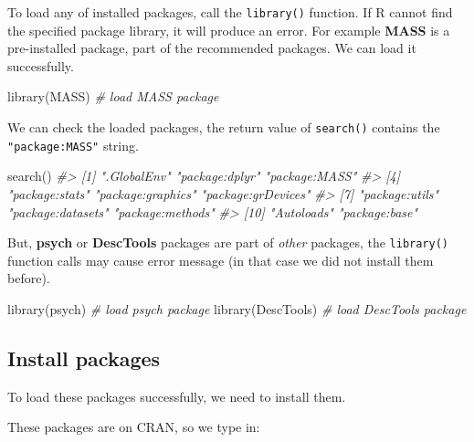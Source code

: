 \documentclass[
]{book}
\newenvironment{Shaded}{\begin{snugshade}}{\end{snugshade}}
\newcommand{\CommentTok}[1]{\textcolor[rgb]{0.56,0.35,0.01}{\textit{#1}}}
\newcommand{\FunctionTok}[1]{\textcolor[rgb]{0.00,0.00,0.00}{#1}}
\newcommand{\NormalTok}[1]{#1}
\begin{document}
To load any of installed packages, call the \texttt{library()} function. If R cannot find the specified package library, it will produce an error. For example \textbf{MASS} is a pre-installed package, part of the recommended packages. We can load it successfully.

\begin{Shaded}
\begin{Highlighting}[]
\FunctionTok{library}\NormalTok{(MASS)    }\CommentTok{\# load MASS package }
\end{Highlighting}
\end{Shaded}

We can check the loaded packages, the return value of \texttt{search()} contains the \texttt{"package:MASS"} string.

\begin{Shaded}
\begin{Highlighting}[]
\FunctionTok{search}\NormalTok{()}
\CommentTok{\#\textgreater{}  [1] ".GlobalEnv"        "package:dplyr"     "package:MASS"     }
\CommentTok{\#\textgreater{}  [4] "package:stats"     "package:graphics"  "package:grDevices"}
\CommentTok{\#\textgreater{}  [7] "package:utils"     "package:datasets"  "package:methods"  }
\CommentTok{\#\textgreater{} [10] "Autoloads"         "package:base"}
\end{Highlighting}
\end{Shaded}

But, \textbf{psych} or \textbf{DescTools} packages are part of \emph{other} packages, the \texttt{library()} function calls may cause error message (in that case we did not install them before).

\begin{Shaded}
\begin{Highlighting}[]
\FunctionTok{library}\NormalTok{(psych)      }\CommentTok{\# load psych package}
\FunctionTok{library}\NormalTok{(DescTools)  }\CommentTok{\# load DescTools package}
\end{Highlighting}
\end{Shaded}

\hypertarget{install-packages}{%
\subsection{Install packages}\label{install-packages}}

To load these packages successfully, we need to install them.

These packages are on CRAN, so we type in:
\end{document}
